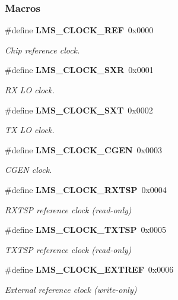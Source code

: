 \subsubsection*{Macros}
\begin{DoxyCompactItemize}
\item 
\#define {\bf L\+M\+S\+\_\+\+C\+L\+O\+C\+K\+\_\+\+R\+EF}~0x0000
\begin{DoxyCompactList}\small\item\em Chip reference clock. \end{DoxyCompactList}\item 
\#define {\bf L\+M\+S\+\_\+\+C\+L\+O\+C\+K\+\_\+\+S\+XR}~0x0001
\begin{DoxyCompactList}\small\item\em RX LO clock. \end{DoxyCompactList}\item 
\#define {\bf L\+M\+S\+\_\+\+C\+L\+O\+C\+K\+\_\+\+S\+XT}~0x0002
\begin{DoxyCompactList}\small\item\em TX LO clock. \end{DoxyCompactList}\item 
\#define {\bf L\+M\+S\+\_\+\+C\+L\+O\+C\+K\+\_\+\+C\+G\+EN}~0x0003
\begin{DoxyCompactList}\small\item\em C\+G\+EN clock. \end{DoxyCompactList}\item 
\#define {\bf L\+M\+S\+\_\+\+C\+L\+O\+C\+K\+\_\+\+R\+X\+T\+SP}~0x0004
\begin{DoxyCompactList}\small\item\em R\+X\+T\+SP reference clock (read-\/only) \end{DoxyCompactList}\item 
\#define {\bf L\+M\+S\+\_\+\+C\+L\+O\+C\+K\+\_\+\+T\+X\+T\+SP}~0x0005
\begin{DoxyCompactList}\small\item\em T\+X\+T\+SP reference clock (read-\/only) \end{DoxyCompactList}\item 
\#define {\bf L\+M\+S\+\_\+\+C\+L\+O\+C\+K\+\_\+\+E\+X\+T\+R\+EF}~0x0006
\begin{DoxyCompactList}\small\item\em External reference clock (write-\/only) \end{DoxyCompactList}\end{DoxyCompactItemize}


